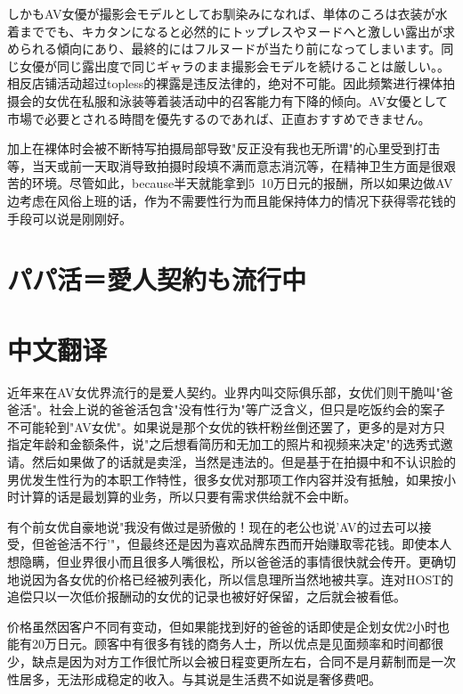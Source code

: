 \documentclass[12pt,UTF8]{ctexbook}
\begin{document}
しかもAV女優が撮影会モデルとしてお馴染みになれば、単体のころは衣装が水着まででも、キカタンになると必然的にトップレスやヌードへと激しい露出が求められる傾向にあり、最終的にはフルヌードが当たり前になってしまいます。同じ女優が同じ露出度で同じギャラのまま撮影会モデルを続けることは厳しい。。相反店铺活动超过topless的裸露是违反法律的，绝对不可能。因此频繁进行裸体拍摄会的女优在私服和泳装等着装活动中的召客能力有下降的倾向。AV女優として市場で必要とされる時間を優先するのであれば、正直おすすめできません。

加上在裸体时会被不断特写拍摄局部导致"反正没有我也无所谓"的心里受到打击等，当天或前一天取消导致拍摄时段填不满而意志消沉等，在精神卫生方面是很艰苦的环境。尽管如此，because半天就能拿到5~10万日元的报酬，所以如果边做AV边考虑在风俗上班的话，作为不需要性行为而且能保持体力的情况下获得零花钱的手段可以说是刚刚好。

\switchcolumn

\section{パパ活＝愛人契約も流行中}

\switchcolumn

\section*{中文翻译}

近年来在AV女优界流行的是爱人契约。业界内叫交际俱乐部，女优们则干脆叫"爸爸活"。社会上说的爸爸活包含"没有性行为"等广泛含义，但只是吃饭约会的案子不可能轮到"AV女优"。如果说是那个女优的铁杆粉丝倒还罢了，更多的是对方只指定年龄和金额条件，说"之后想看简历和无加工的照片和视频来决定"的选秀式邀请。然后如果做了的话就是卖淫，当然是违法的。但是基于在拍摄中和不认识脸的男优发生性行为的本职工作特性，很多女优对那项工作内容并没有抵触，如果按小时计算的话是最划算的业务，所以只要有需求供给就不会中断。

有个前女优自豪地说"我没有做过是骄傲的！现在的老公也说'AV的过去可以接受，但爸爸活不行'"，但最终还是因为喜欢品牌东西而开始赚取零花钱。即使本人想隐瞒，但业界很小而且很多人嘴很松，所以爸爸活的事情很快就会传开。更确切地说因为各女优的价格已经被列表化，所以信息理所当然地被共享。连对HOST的追偿只以一次低价报酬动的女优的记录也被好好保留，之后就会被看低。

价格虽然因客户不同有变动，但如果能找到好的爸爸的话即使是企划女优2小时也能有20万日元。顾客中有很多有钱的商务人士，所以优点是见面频率和时间都很少，缺点是因为对方工作很忙所以会被日程变更所左右，合同不是月薪制而是一次性居多，无法形成稳定的收入。与其说是生活费不如说是奢侈费吧。
\end{document}
